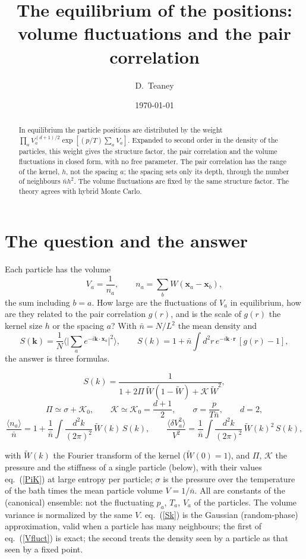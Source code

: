 \documentclass[11pt,aps,preprint,nofootinbib,superscriptaddress,tightenlines]{revtex4-2}
\newcommand{\avg}[1]{\langle #1\rangle}
\def\st{\begin{equation}}
\def\stp{\end{equation}}
\def\Eq#1{eq.~(\ref{#1})}
\begin{document}
\title{The equilibrium of the positions: volume fluctuations and the pair correlation}
\author{D.~Teaney}
\date{\today}

\begin{abstract}
In equilibrium the particle positions are distributed by the weight $\prod_aV_a^{(d+1)/2}\exp[(p/T)\sum_aV_a]$.  Expanded to second order in the
density of the particles, this weight gives the structure factor, the pair correlation and the volume fluctuations in closed form, with no
free parameter.  The pair correlation has the range of the kernel, $h$, not the spacing $a$; the spacing sets only its depth, through the number
of neighbours $\bar nh^2$.  The volume fluctuations are fixed by the same structure factor.  The theory agrees with hybrid Monte Carlo.
\end{abstract}

\maketitle

\section{The question and the answer}
\label{sec:answer}

Each particle has the volume
\st
V_a=\frac1{n_a},\qquad n_a=\sum_bW(\bm x_a-\bm x_b),
\label{volume}
\stp
the sum including $b=a$.  How large are the fluctuations of $V_a$ in equilibrium, how are they related to the pair correlation $g(r)$, and is
the scale of $g(r)$ the kernel size $h$ or the spacing $a$?  With $\bar n=N/L^2$ the mean density and
\st
S(\bm k)=\frac1N\Big\langle\Big|\sum_ae^{-i\bm k\cdot\bm x_a}\Big|^2\Big\rangle,\qquad
S(k)=1+\bar n\int d^2r\,e^{-i\bm k\cdot\bm r}\,[g(r)-1],
\stp
the answer is three formulas.
\begin{keyeq}
\st
S(k)=\frac{1}{1+2\Pi\,\widetilde W(1-\widetilde W)+\mathcal K\,\widetilde W^2},
\label{Sk}
\stp
\st
\Pi\simeq\sigma+\mathcal K_0,\qquad \mathcal K\simeq\mathcal K_0=\frac{d+1}2,\qquad \sigma=\frac{p}{T\bar n},\qquad d=2,
\label{PiK}
\stp
\st
\frac{\avg{n_a}}{\bar n}=1+\frac1{\bar n}\int\!\frac{d^2k}{(2\pi)^2}\,\widetilde W(k)\,S(k),\qquad
\frac{\avg{\delta V_a^2}}{V^2}=\frac1{\bar n}\int\!\frac{d^2k}{(2\pi)^2}\,\widetilde W(k)^2\,S(k),
\label{Vfluct}
\stp
\end{keyeq}
with $\widetilde W(k)$ the Fourier transform of the kernel ($\widetilde W(0)=1$), and $\Pi$, $\mathcal K$ the pressure and the stiffness of a single
particle (below), with their values \Eq{PiK} at large entropy per particle; $\sigma$ is the pressure over the temperature of the bath times the mean
particle volume $V=1/\bar n$.  All are constants of the (canonical) ensemble: not the fluctuating $p_a$, $T_a$, $V_a$ of the particles.  The volume variance is normalized by the same $V$.  \Eq{Sk} is the Gaussian (random-phase) approximation, valid when a particle has many
neighbours; the first of \Eq{Vfluct} is exact; the second treats the density seen by a particle as that seen by a fixed point.
\end{document}
